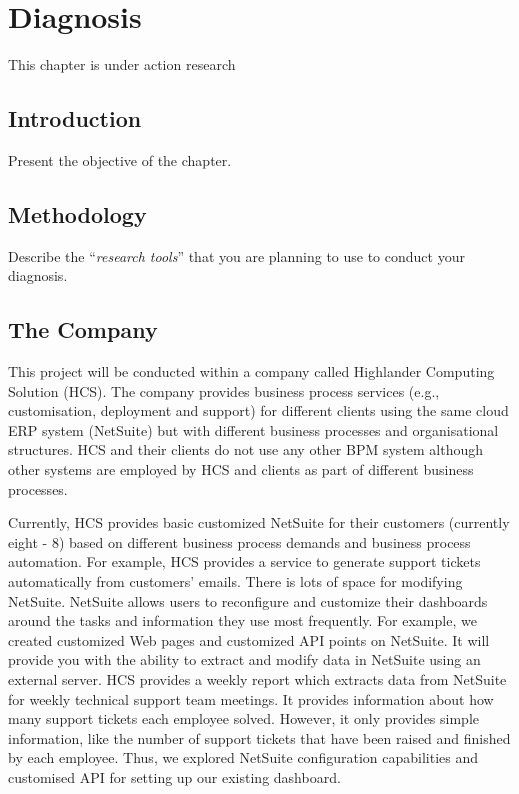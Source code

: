 \chapter{Diagnosis}
\label{chap:diagnosis}

This chapter is under action research 

\section{Introduction}

Present the objective of the chapter.

\section{Methodology}

Describe the ``\textit{research tools}'' that you are planning to use to conduct your diagnosis.

\section{The Company}
\label{sec:diagnosis-company}

This project will be conducted within a company called Highlander Computing Solution (HCS). The company provides business process services (e.g., customisation, deployment and support) for different clients using the same cloud ERP system (NetSuite) but with different business processes and organisational structures. HCS and their clients do not use any other BPM system although other systems are employed by HCS and clients as part of different business processes.\par

Currently, HCS provides basic customized NetSuite for their customers (currently eight - 8) based on different business process demands and business process automation. For example, HCS provides a service to generate support tickets automatically from customers’ emails. There is lots of space for modifying NetSuite. NetSuite allows users to reconfigure and customize their dashboards around the tasks and information they use most frequently. For example, we created customized Web pages and customized API points on NetSuite. It will provide you with the ability to extract and modify data in NetSuite using an external server. HCS provides a weekly report which extracts data from NetSuite for weekly technical support team meetings. It provides information about how many support tickets each employee solved. However, it only provides simple information, like the number of support tickets that have been raised and finished by each employee. Thus, we explored NetSuite configuration capabilities and customised API  for setting up our existing dashboard. \par

